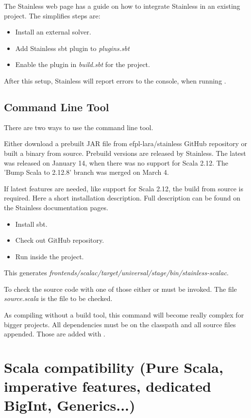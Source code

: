 The Stainless web page has a guide on how to integrate Stainless in an existing project.
The simplifies steps are:
\begin{itemize}
  \item Install an external solver.
  \item Add Stainless sbt plugin to \emph{plugins.sbt}
  \item Enable the plugin in \emph{build.sbt} for the project.
\end{itemize}
After this setup, Stainless will report errors to the console, when running .

\subsection{Command Line Tool}
There are two ways to use the command line tool.

Either download a prebuilt JAR file from efpl-lara/stainless GitHub repository or built a binary from source.
Prebuild versions are released by Stainless.
The latest was released on January 14, when there was no support for Scala 2.12.
The 'Bump Scala to 2.12.8' branch was merged on March 4.

If latest features are needed, like support for Scala 2.12, the build from source is required.
Here a short installation description.
Full description can be found on the Stainless documentation pages.
\begin{itemize}
  \item Install sbt.
  \item Check out GitHub repository.
  \item Run  inside the project.
\end{itemize}
This generates \emph{frontends/scalac/target/universal/stage/bin/stainless-scalac}.

To check the source code with one of those either  or  must be invoked.
The file \emph{source.scala} is the file to be checked.

As compiling without a build tool, this command will become really complex for bigger projects.
All dependencies must be on the classpath and all source files appended.
Those are added with .

\section{Scala compatibility (Pure Scala, imperative features, dedicated BigInt, Generics...)}

